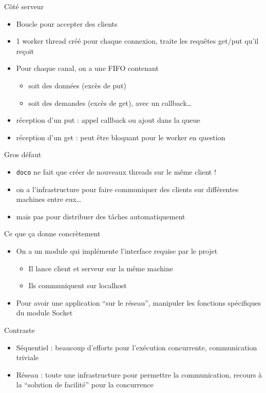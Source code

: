 \documentclass[xetex]{beamer}
\begin{document}
\begin{frame}{Côté serveur}
  \begin{itemize}
  \item Boucle pour accepter des clients
  \item 1 worker thread créé pour chaque connexion, traite les requêtes
    get/put qu'il reçoit
  \item Pour chaque canal, on a une FIFO contenant
    \begin{itemize}
    \item soit des données (excès de put)
    \item soit des demandes (excès de get), avec un callback\ldots
    \end{itemize}
  \item réception d'un put : appel callback ou ajout dans la queue
  \item réception d'un get : peut être bloquant pour le worker en question
  \end{itemize}
\end{frame}

\begin{frame}{Gros défaut}
  \begin{itemize}
  \item \texttt{doco} ne fait que créer de nouveaux threads sur le même client !
  \item on a l'infrastructure pour faire communiquer des clients
    sur différentes machines entre eux\ldots
  \item mais pas pour distribuer des tâches automatiquement
  \end{itemize}
\end{frame}

\begin{frame}{Ce que ça donne concrètement}
  \begin{itemize}
  \item On a un module qui implémente l'interface requise par le projet
    \begin{itemize}
    \item Il lance client et serveur sur la même machine
    \item Ils communiquent sur localhost
    \end{itemize}
  \item Pour avoir une application ``sur le réseau'', manipuler
    les fonctions spécifiques du module Socket
  \end{itemize}
\end{frame}

\begin{frame}{Contraste}
  \begin{itemize}
  \item Séquentiel : beaucoup d'efforts pour l'exécution
    concurrente, communication triviale
  \item Réseau : toute une infrastructure pour permettre la communication,
    recours à la ``solution de facilité'' pour la concurrence
  \end{itemize}
\end{frame}
\end{document}

